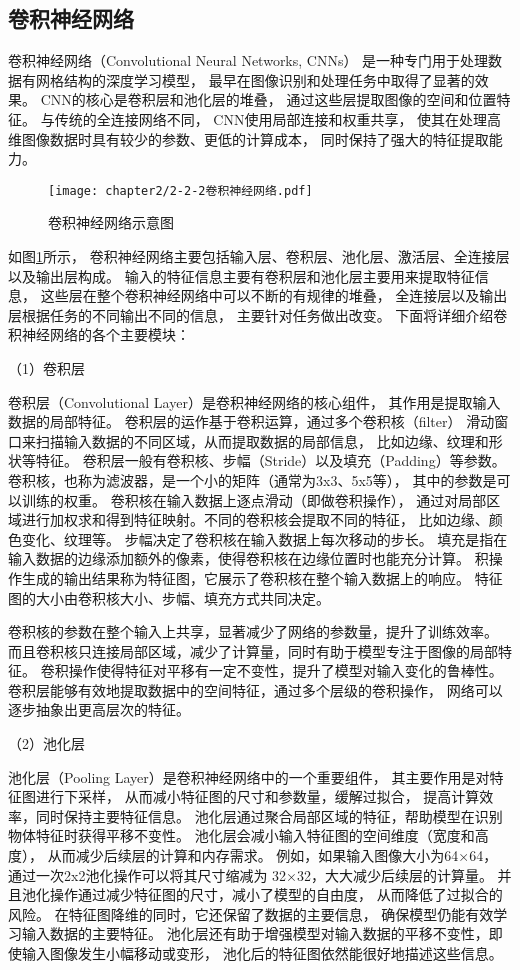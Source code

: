 \subsection{卷积神经网络}
卷积神经网络（Convolutional Neural Networks, CNNs）
是一种专门用于处理数据有网格结构的深度学习模型，
最早在图像识别和处理任务中取得了显著的效果。
CNN的核心是卷积层和池化层的堆叠，
通过这些层提取图像的空间和位置特征。
与传统的全连接网络不同，
CNN使用局部连接和权重共享，
使其在处理高维图像数据时具有较少的参数、更低的计算成本，
同时保持了强大的特征提取能力。
\begin{figure}[H]
    \centering
    \texttt{[image: chapter2/2-2-2卷积神经网络.pdf]}
    \caption{\label{fig:2-2-2-conv}卷积神经网络示意图}
\end{figure}
如图\ref{fig:2-2-2-conv}所示，
卷积神经网络主要包括输入层、卷积层、池化层、激活层、全连接层以及输出层构成。
输入的特征信息主要有卷积层和池化层主要用来提取特征信息，
这些层在整个卷积神经网络中可以不断的有规律的堆叠，
全连接层以及输出层根据任务的不同输出不同的信息，
主要针对任务做出改变。
下面将详细介绍卷积神经网络的各个主要模块：

（1）卷积层

卷积层（Convolutional Layer）是卷积神经网络的核心组件，
其作用是提取输入数据的局部特征。
卷积层的运作基于卷积运算，通过多个卷积核（filter）
滑动窗口来扫描输入数据的不同区域，从而提取数据的局部信息，
比如边缘、纹理和形状等特征。
卷积层一般有卷积核、步幅（Stride）以及填充（Padding）等参数。
卷积核，也称为滤波器，是一个小的矩阵（通常为3x3、5x5等），
其中的参数是可以训练的权重。
卷积核在输入数据上逐点滑动（即做卷积操作），
通过对局部区域进行加权求和得到特征映射。不同的卷积核会提取不同的特征，
比如边缘、颜色变化、纹理等。
步幅决定了卷积核在输入数据上每次移动的步长。
填充是指在输入数据的边缘添加额外的像素，使得卷积核在边缘位置时也能充分计算。
积操作生成的输出结果称为特征图，它展示了卷积核在整个输入数据上的响应。
特征图的大小由卷积核大小、步幅、填充方式共同决定。

卷积核的参数在整个输入上共享，显著减少了网络的参数量，提升了训练效率。
而且卷积核只连接局部区域，减少了计算量，同时有助于模型专注于图像的局部特征。
卷积操作使得特征对平移有一定不变性，提升了模型对输入变化的鲁棒性。
卷积层能够有效地提取数据中的空间特征，通过多个层级的卷积操作，
网络可以逐步抽象出更高层次的特征。

（2）池化层

池化层（Pooling Layer）是卷积神经网络中的一个重要组件，
其主要作用是对特征图进行下采样，
从而减小特征图的尺寸和参数量，缓解过拟合，
提高计算效率，同时保持主要特征信息。
池化层通过聚合局部区域的特征，帮助模型在识别物体特征时获得平移不变性。
池化层会减小输入特征图的空间维度（宽度和高度），
从而减少后续层的计算和内存需求。
例如，如果输入图像大小为64×64，
通过一次2x2池化操作可以将其尺寸缩减为 
32×32，大大减少后续层的计算量。
并且池化操作通过减少特征图的尺寸，减小了模型的自由度，
从而降低了过拟合的风险。
在特征图降维的同时，它还保留了数据的主要信息，
确保模型仍能有效学习输入数据的主要特征。
池化层还有助于增强模型对输入数据的平移不变性，即使输入图像发生小幅移动或变形，
池化后的特征图依然能很好地描述这些信息。

